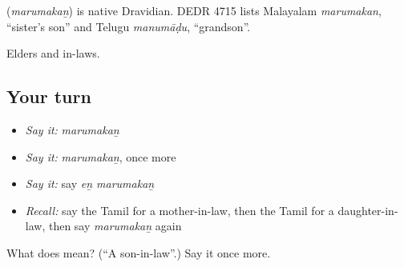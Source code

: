 \begin{cousinweb}
\textbf{} (\emph{marumakaṉ}) is native Dravidian. DEDR 4715 lists Malayalam \emph{marumakan}, \textquotedblleft{}sister's son\textquotedblright{} and Telugu \emph{manumāḍu}, \textquotedblleft{}grandson\textquotedblright{}.
\end{cousinweb}

\begin{grammarlens}[title={What you've built}]
Elders and in-laws.
\end{grammarlens}

\subsection*{Your turn}
\begin{itemize}
\raggedright
  \item \emph{Say it:} \emph{marumakaṉ}
  \item \emph{Say it:} \emph{marumakaṉ}, once more
  \item \emph{Say it:} say \emph{eṉ marumakaṉ}
  \item \emph{Recall:} say the Tamil for a mother-in-law, then the Tamil for a daughter-in-law, then say \emph{marumakaṉ} again
\end{itemize}

\begin{tcolorbox}[breakable,colback=teal!4,colframe=teal!35!black,title={Before you move on}]
What does  mean? (\textquotedblleft{}A son-in-law\textquotedblright{}.) Say it once more.
\end{tcolorbox}
